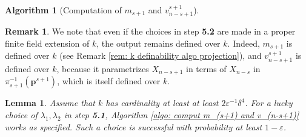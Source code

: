 \documentclass[pdflatex,sn-basic]{sn-jnl}%
\theoremstyle{thmstyleone}%
\theoremstyle{thmstyletwo}%
\theoremstyle{thmstylethree}%
\newtheorem{lemma}[theorem]{Lemma}
\theoremstyle{definition}
\newtheorem{remark}[theorem]{Remark}
\numberwithin{equation}{section}
\newtheorem{algorithm}[theorem]{Algorithm}
\newcommand{\bfs}{\boldsymbol}
\begin{document}
\begin{algorithm}[Computation of $m_{s+1}$ and $v_{n-s+1}^{s+1}$]
\end{algorithm}

\begin{remark}\label{rem: k definability comput m_(s+1) and v_(n-s+1)}
We note that even if the choices in step {\bf 5.2} are made in a
proper finite field extension of $k$, the output remains defined
over $k$. Indeed, $m_{s+1}$ is defined over $k$ (see Remark
\ref{rem: k definability algo projection}), and $v_{n-s+1}^{s+1}$ is
defined over $k$, because it parametrizes $X_{n-s+1}$ in terms of
$X_{n-s}$ in $\pi_{s+1}^{-1}(\bfs p^{s+1})$, which is itself defined
over $k$.
\end{remark}

\begin{lemma}\label{lemma: correctness comput m_(s+1) and v_(n-s+1)}
Assume that $k$ has cardinality at least at least
$2\varepsilon^{-1}\delta^4$. For a lucky choice of
$\lambda_1,\lambda_2$ in step {\bf 5.1}, Algorithm \ref{algo: comput
m_(s+1) and v_(n-s+1)} works as specified. Such a choice is
successful with probability at least $1-\varepsilon$.
\end{lemma}
%
\end{document}
